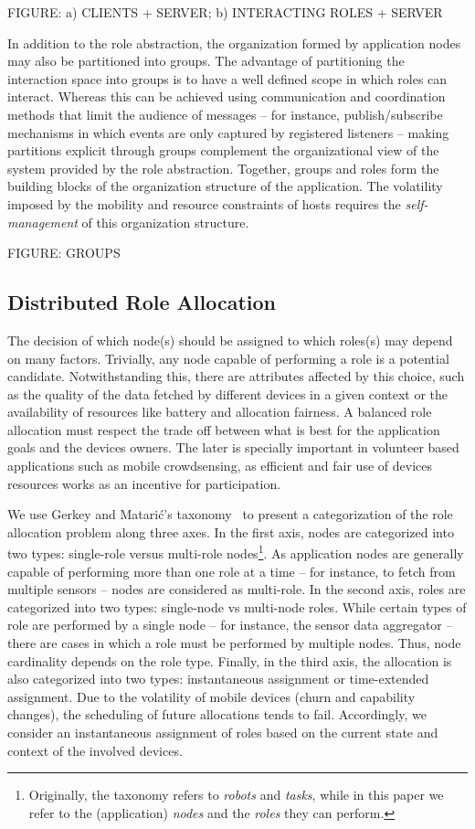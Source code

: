 FIGURE: a) CLIENTS + SERVER; b) INTERACTING ROLES + SERVER

In addition to the role abstraction, the organization formed by application nodes may also be partitioned into groups. The advantage of partitioning the interaction space into groups is to have a well defined scope in which roles can interact. Whereas this can be achieved using communication and coordination methods that limit the audience of messages -- for instance, publish/subscribe mechanisms in which events are only captured by registered listeners -- making partitions explicit through groups complement the organizational view of the system provided by the role abstraction. Together, groups and roles form the building blocks of the organization structure of the application. The volatility imposed by the mobility and resource constraints of hosts requires the \textit{self-management} of this organization structure.

FIGURE: GROUPS

\subsection{Distributed Role Allocation}
 
The decision of which node(s) should be assigned to which roles(s) may depend on many factors. Trivially, any node capable of performing a role is a potential candidate. Notwithstanding this, there are attributes affected by this choice, such as the quality of the data fetched by different devices in a given context or the availability of resources like battery and allocation fairness. A balanced role allocation must respect the trade off between what is best for the application goals and the devices owners. The later is specially important in volunteer based applications such as mobile crowdsensing, as efficient and fair use of devices resources works as an incentive for participation. 

We use Gerkey and Matarić’s taxonomy~\cite{} to present a categorization of the role allocation problem along three axes. In the first axis, nodes are categorized into two types: single-role versus multi-role nodes\footnote{Originally, the taxonomy refers to \textit{robots} and \textit{tasks}, while in this paper we refer to the (application) \textit{nodes} and the \textit{roles} they can perform.}. As application nodes are generally capable of performing more than one role at a time -- for instance, to fetch from multiple sensors -- nodes are considered as multi-role. In the second axis, roles are categorized into two types: single-node vs multi-node roles. While certain types of role are performed by a single node -- for instance, the sensor data aggregator -- there are cases in which a role must be performed by multiple nodes. Thus, node cardinality depends on the role type. Finally, in the third axis, the allocation is also categorized into two types: instantaneous assignment or time-extended assignment. Due to the volatility of mobile devices (churn and capability changes), the scheduling of future allocations tends to fail. Accordingly, we consider an instantaneous assignment of roles based on the current state and context of the involved devices.

